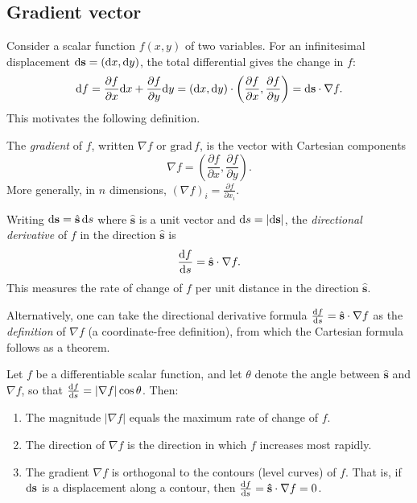 \documentclass[a4paper]{article}
\begin{document}
\subsection{Gradient vector}
\begin{remark}[Motivation]
  Consider a scalar function $f(x, y)$ of two variables. For an infinitesimal displacement $\mathrm{d}\mathbf{s} = (\mathrm{d} x, \mathrm{d} y)$, the total differential gives the change in $f$:
  \[
    \mathrm{d} f = \frac{\partial f}{\partial x}\mathrm{d} x + \frac{\partial f}{\partial y}\mathrm{d} y = (\mathrm{d} x, \mathrm{d} y)\cdot \left(\frac{\partial f}{\partial x}, \frac{\partial f}{\partial y}\right) = \mathrm{d}\mathbf{s}\cdot \nabla f.
  \]
  This motivates the following definition.
\end{remark}

\begin{defi}
  The \emph{gradient} of $f$, written $\nabla f$ or $\mathrm{grad}\, f$, is the vector with Cartesian components
  \[
    \nabla f = \left(\frac{\partial f}{\partial x}, \frac{\partial f}{\partial y}\right).
  \]
  More generally, in $n$ dimensions, $(\nabla f)_i = \frac{\partial f}{\partial x_i}$.
\end{defi}

\begin{defi}
  Writing $\mathrm{d}\mathbf{s} = \hat{\mathbf{s}}\,\mathrm{d} s$ where $\hat{\mathbf{s}}$ is a unit vector and $\mathrm{d} s = |\mathrm{d}\mathbf{s}|$, the \emph{directional derivative} of $f$ in the direction $\hat{\mathbf{s}}$ is
  \[
    \frac{\mathrm{d} f}{\mathrm{d} s} = \hat{\mathbf{s}}\cdot \nabla f.
  \]
  This measures the rate of change of $f$ per unit distance in the direction $\hat{\mathbf{s}}$.
\end{defi}

\begin{remark}
  Alternatively, one can take the directional derivative formula $\frac{\mathrm{d} f}{\mathrm{d} s} = \hat{\mathbf{s}} \cdot \nabla f$ as the \emph{definition} of $\nabla f$ (a coordinate-free definition), from which the Cartesian formula follows as a theorem.
\end{remark}

\begin{prop}
  Let $f$ be a differentiable scalar function, and let $\theta$ denote the angle between $\hat{\mathbf{s}}$ and $\nabla f$, so that $\frac{\mathrm{d} f}{\mathrm{d} s} = |\nabla f|\cos\theta$. Then:
  \begin{enumerate}
    \item The magnitude $|\nabla f|$ equals the maximum rate of change of $f$.
    \item The direction of $\nabla f$ is the direction in which $f$ increases most rapidly.
    \item The gradient $\nabla f$ is orthogonal to the contours (level curves) of $f$. That is, if $\mathrm{d}\mathbf{s}$ is a displacement along a contour, then $\frac{\mathrm{d} f}{\mathrm{d} s} = \mathbf{\hat{s}}\cdot \nabla f = 0$.
  \end{enumerate}
\end{prop}
\end{document}
